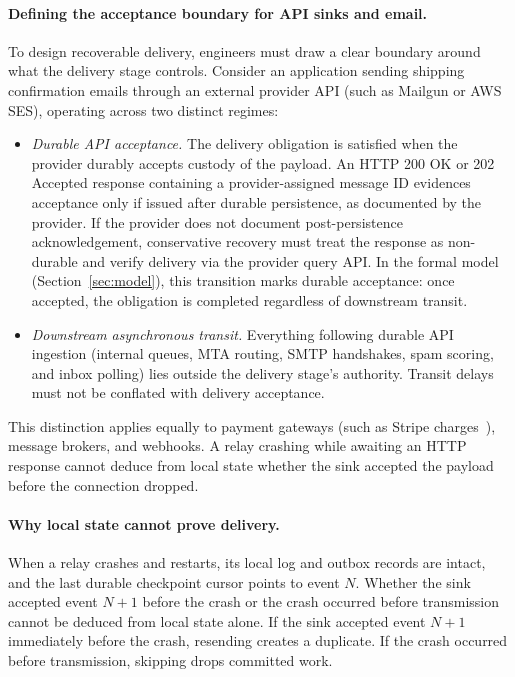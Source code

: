 \documentclass[sigplan,10pt]{acmart}
\theoremstyle{plain}
\theoremstyle{definition}
\begin{document}
\paragraph{Defining the acceptance boundary for API sinks and email.}
To design recoverable delivery, engineers must draw a clear boundary
around what the delivery stage controls. Consider an application sending
shipping confirmation emails through an external provider API (such as
Mailgun or AWS SES), operating across two distinct regimes:
\begin{itemize}
\item \emph{Durable API acceptance.} The delivery obligation is satisfied
  when the provider durably accepts custody of the payload. An HTTP 200 OK
  or 202 Accepted response containing a provider-assigned message ID evidences
  acceptance only if issued after durable persistence, as documented by
  the provider. If the provider does not document post-persistence acknowledgement,
  conservative recovery must treat the response as non-durable and verify
  delivery via the provider query API. In the formal model
  (Section~\ref{sec:model}), this transition marks durable acceptance: once
  accepted, the obligation is completed regardless of downstream transit.
\item \emph{Downstream asynchronous transit.} Everything following durable
  API ingestion (internal queues, MTA routing, SMTP handshakes, spam scoring,
  and inbox polling) lies outside the delivery stage's authority. Transit
  delays must not be conflated with delivery acceptance.
\end{itemize}
This distinction applies equally to payment gateways (such as Stripe charges~\cite{stripe}),
message brokers, and webhooks. A relay crashing while awaiting an HTTP response
cannot deduce from local state whether the sink accepted the payload before the
connection dropped.

\paragraph{Why local state cannot prove delivery.}
When a relay crashes and restarts, its local log and outbox records are
intact, and the last durable checkpoint cursor points to event $N$. Whether the
sink accepted event $N+1$ before the crash or the crash occurred before
transmission cannot be deduced from local state alone. If the sink accepted
event $N+1$ immediately before the crash, resending creates a duplicate. If the
crash occurred before transmission, skipping drops committed work.
\end{document}
